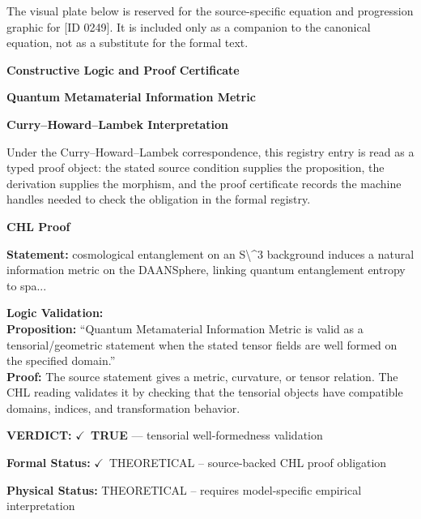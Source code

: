 \begingroup\footnotesize\sloppy
The visual plate below is reserved for the source-specific equation and progression graphic for [ID 0249]. It is included only as a companion to the canonical equation, not as a substitute for the formal text.
\par\endgroup
\ifTZPDarkEdition
{}
\fi

\clearpage
\begingroup\tzpsupportsetup
\noindent\textbf{\fontsize{10.8pt}{12.8pt}\selectfont [ID 0249] Constructive Logic and Proof Certificate}\par
\noindent\textbf{\fontsize{10pt}{12pt}\selectfont Quantum Metamaterial Information Metric}\par
\vspace{0.45em}
\begingroup
\footnotesize
\setlength{\parskip}{0.22em}
\setlength{\parindent}{0pt}
\noindent\textbf{Curry--Howard--Lambek Interpretation}\par
Under the Curry--Howard--Lambek correspondence, this registry entry is read as a typed proof
object: the stated source condition supplies the proposition, the derivation supplies the
morphism, and the proof certificate records the machine handles needed to check the obligation
in the formal registry.

\vspace{0.45em}
\noindent\textbf{CHL Proof}\par
\textbf{Statement:} cosmological entanglement on an S\textbackslash{}\textasciicircum{}3 background induces a natural information metric on
the DAANSphere, linking quantum entanglement entropy to spa...

\textbf{Logic Validation:}\\
\textbf{Proposition:} ``Quantum Metamaterial Information Metric is valid as a tensorial/geometric statement when
the stated tensor fields are well formed on the specified domain.''\\
\textbf{Proof:} The source statement gives a metric, curvature, or tensor relation. The CHL reading
validates it by checking that the tensorial objects have compatible domains, indices,
and transformation behavior.

\textbf{VERDICT:} \ensuremath{\checkmark}\ \textbf{TRUE} --- tensorial well-formedness validation

\textbf{Formal Status:} \ensuremath{\checkmark}\ THEORETICAL -- source-backed CHL proof obligation

\textbf{Physical Status:} THEORETICAL -- requires model-specific empirical interpretation
\par\vspace{0.45em}
\par
\ifTZPDarkEdition
{}
\fi
\endgroup
\endgroup
